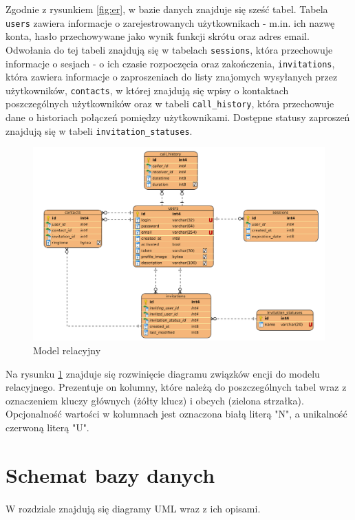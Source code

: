 \documentclass{article}
\begin{document}
    Zgodnie z rysunkiem \ref{fig:er}, w bazie danych znajduje się sześć tabel. Tabela \texttt{users} zawiera informacje o zarejestrowanych użytkownikach - m.in. ich nazwę konta, hasło przechowywane jako wynik funkcji skrótu oraz adres email. Odwołania do tej tabeli znajdują się w tabelach \texttt{sessions}, która przechowuje informacje o sesjach - o ich czasie rozpoczęcia oraz zakończenia, \texttt{invitations}, która zawiera informacje o zaproszeniach do listy znajomych wysyłanych przez użytkowników, \texttt{contacts}, w której znajdują się wpisy o kontaktach poszczególnych użytkowników oraz w tabeli \texttt{call\_history}, która przechowuje dane o historiach połączeń pomiędzy użytkownikami. Dostępne statusy zaproszeń znajdują się w tabeli \texttt{invitation\_statuses}.

    \begin{figure}[H]
      \centering
        \includegraphics[width=1.0\linewidth]{assets/rel.png}
        \caption[]{Model relacyjny}
        \label{fig:rel}
    \end{figure}

    Na rysunku \ref{fig:rel} znajduje się rozwinięcie diagramu związków encji do modelu relacyjnego. Prezentuje on kolumny, które należą do poszczególnych tabel wraz z oznaczeniem kluczy głównych (żółty klucz) i obcych (zielona strzałka). Opcjonalność wartości w kolumnach jest oznaczona białą literą "N", a unikalność czerwoną literą "U".

    \section{Schemat bazy danych}
    \paragraph{} W rozdziale znajdują się diagramy UML wraz z ich opisami.
\end{document}
